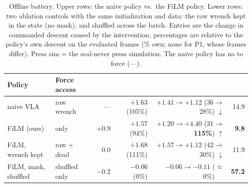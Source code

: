 \begin{table}[!t]
\caption{Offline battery. Upper rows: the naive policy vs.\ the FiLM policy. Lower rows: two ablation controls with the same initialization and data: the raw
wrench kept in the state (no mask), and \chat{} shuffled across the batch. Entries are the change in commanded descent caused by the intervention;
percentages are relative to the policy's own descent on the evaluated frames (\% own; none for
P1, whose frames differ). Press sim = the seal-never press simulation. The naive policy has no
\chat{} to force (---).}
\label{tab:probes}
\centering\setlength{\tabcolsep}{4.5pt}
\begin{tabular}{llrrrr}
\toprule
Policy & Force access &  &  &  &  \\
\midrule
naive VLA   & raw wrench               & ---                     & $+1.63$ (105\%)            & $+1.41\rightarrow+1.12$ (36$\rightarrow$28\%) $\downarrow$ & 14.9 \\
FiLM (ours) & \chat{} only              & $\mathbf{+0.9}$         & $+1.57$ (\phantom{1}94\%)  & $+1.20\rightarrow\mathbf{+4.40}$ (31$\rightarrow$\textbf{115\%}) $\uparrow$ & \textbf{9.8} \\
\midrule
FiLM, wrench kept            & raw + dead \chat{}  & $\phantom{+}0.0$ & $+1.68$ (111\%)           & $+1.57\rightarrow+1.12$ (42$\rightarrow$30\%) $\downarrow$ & 11.9 \\
FiLM, mask, shuffled \chat{} & shuffled \chat{} only & $-0.2$           & $-0.06$ (\phantom{10}0\%) & $-0.06\rightarrow-0.11$ ($\approx$0\%) $\phantom{\downarrow}$ & \textbf{57.2} \\
\bottomrule
\end{tabular}
\end{table}

